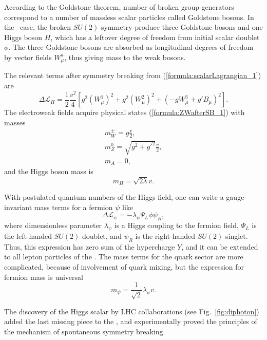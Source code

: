 According to the Goldstone theorem, number of broken group generators correspond to a number of massless scalar particles called Goldstone bosons. 
In the \sm\ case, the broken $SU(2)$ symmetry produce three Goldstone bosons and one Higgs boson $H$, which has a leftover degree of freedom from initial scalar doublet $\phi$.
The three Goldstone bosons are absorbed as longitudinal degrees of freedom by vector fields $W^a_\mu$, thus giving mass to the weak bosons.

The relevant terms after symmetry breaking from (\ref{formula:scalarLagrangian_1}) are
\begin{equation}
	\Delta \mathcal{L}_{H} = \frac{1}{2} \frac{v^2}{4}[g^2 (W^1_\mu)^2 + g^2 (W^2_\mu)^2 + (-g W^3_\mu + g' B_\mu)^2].
\end{equation}
The electroweak fields acquire physical states (\ref{formula:ZWafterSB_1}) with masses
\begin{equation}
\begin{array}{l}
m_W^\pm = g\frac{v}{2},\\
m_Z^0 = \sqrt{g^2 + g'^2}\frac{v}{2},\\
m_A = 0,
\end{array}
\label{formula:ZWmassafterSB_1}
\end{equation}
and the Higgs boson mass is
\begin{equation}
m_H = \sqrt{2\lambda}v.
\end{equation}

With postulated quantum numbers of the Higgs field, one can write a gauge-invariant mass terms for a fermion $\psi$ like 
\begin{equation}
	\Delta \mathcal{L}_\psi = -\lambda_\psi \Psi_L \phi \psi_R,
\end{equation}
where dimensionless parameter $\lambda_\psi$ is a Higgs coupling to the fermion field, $\Psi_L$ is the left-handed $SU(2)$ doublet, and $\psi_R$ is the right-handed $SU(2)$ singlet. Thus, this expression has zero sum of the hypercharge $Y$, and it can be extended to all lepton particles of the \sm. The mass terms for the quark sector are more complicated, because of involvement of quark mixing, but the expression for fermion mass is universal
\begin{equation}
	m_\psi = \frac{1}{\sqrt{2}} \lambda_\psi v.
    \label{formula:fermionMass_1}
\end{equation}

The discovery of the Higgs scalar by LHC collaborations (see Fig.~\ref{fig:diphoton}) added the last missing piece to the \sm, and experimentally proved the principles of the mechanism of spontaneous symmetry breaking.

